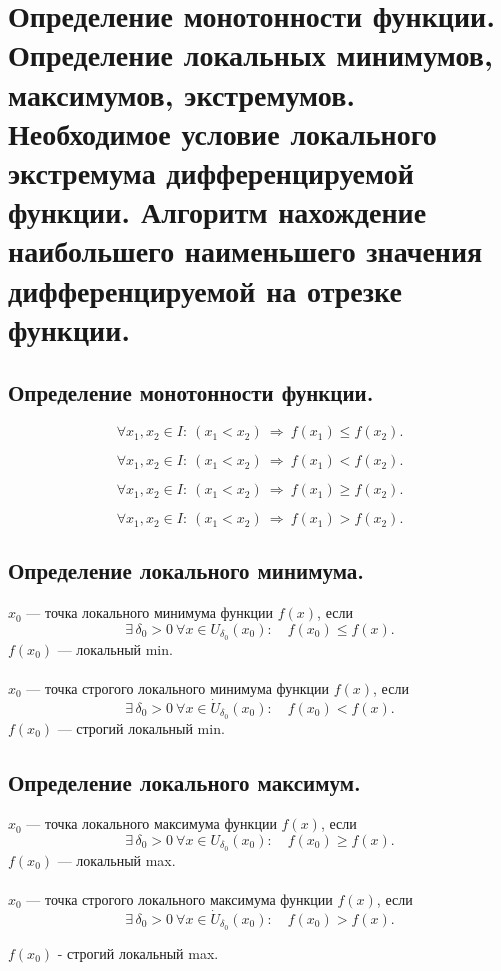 \section{Определение монотонности функции. Определение локальных минимумов, максимумов, экстремумов. Необходимое условие локального экстремума дифференцируемой функции. Алгоритм нахождение наибольшего наименьшего значения дифференцируемой на отрезке функции.}

\subsection{Определение монотонности функции.}

\begin{definition}
\[
\forall x_1,x_2\in I:\ (x_1<x_2)\ \Rightarrow\ f(x_1)\le f(x_2).
\]
\end{definition}

\begin{definition}
\[
\forall x_1,x_2\in I:\ (x_1<x_2)\ \Rightarrow\ f(x_1)< f(x_2).
\]
\end{definition}

\begin{definition}
\[
\forall x_1,x_2\in I:\ (x_1<x_2)\ \Rightarrow\ f(x_1)\ge f(x_2).
\]
\end{definition}

\begin{definition}
\[
\forall x_1,x_2\in I:\ (x_1<x_2)\ \Rightarrow\ f(x_1)> f(x_2).
\]
\end{definition}




\subsection{Определение локального минимума.}
\begin{definition}
$x_0$ — точка локального минимума функции $f(x)$, если
\[
\exists\,\delta_0>0\ \forall x\in U_{\delta_0}(x_0):\quad f(x_0)\le f(x).
\]
$f(x_0)$ — локальный min.
\[
\]
\\
$x_0$ — точка строгого локального минимума функции $f(x)$, если
\[
\exists\,\delta_0>0\ \forall x\in \dot U_{\delta_0}(x_0):\quad f(x_0)< f(x).
\]
$f(x_0)$ — строгий локальный min.
\end{definition}

\subsection{Определение локального максимум.}
\begin{definition}
$x_0$ — точка локального максимума функции $f(x)$, если
\[
\exists\,\delta_0>0\ \forall x\in U_{\delta_0}(x_0):\quad f(x_0)\ge f(x).
\]
$f(x_0)$ — локальный max.
\[
\]
\\
$x_0$ — точка строгого локального максимума функции $f(x)$, если
\[
\exists\,\delta_0>0\ \forall x\in \dot U_{\delta_0}(x_0):\quad f(x_0)> f(x).
\]

$f(x_0)$ - строгий локальный max.
\end{definition}

